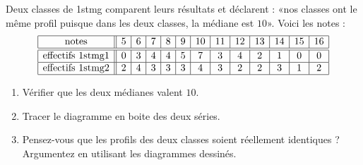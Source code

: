 
\begin{exercice}\label{exosmath-0392}

    Deux classes de 1stmg comparent leurs résultats et déclarent : «nos classes ont le même profil puisque dans les deux classes, la médiane est \( 10\)». Voici les notes :
    \begin{equation*}
        \begin{array}[]{|c||c|c|c|c|c|c|c|c|c|c|c|c|}
            \hline
            \text{notes}&5&6&7&8&9&10&11&12&13&14&15&16\\
            \hline\hline
            \text{effectifs 1stmg1}&0&3&4&4&5&7&3&4&2&1&0&0\\
            \hline
            \text{effectifs 1stmg2}&2&4&3&3&3&4&3&2&2&3&1&2\\
            \hline
        \end{array}
    \end{equation*}
    \begin{enumerate}
        \item
            Vérifier que les deux médianes valent \( 10\).
        \item
            Tracer le diagramme en boite des deux séries.
        \item
            Pensez-vous que les profils des deux classes soient réellement identiques ? Argumentez en utilisant les diagrammes dessinés.
    \end{enumerate}

\end{exercice}
